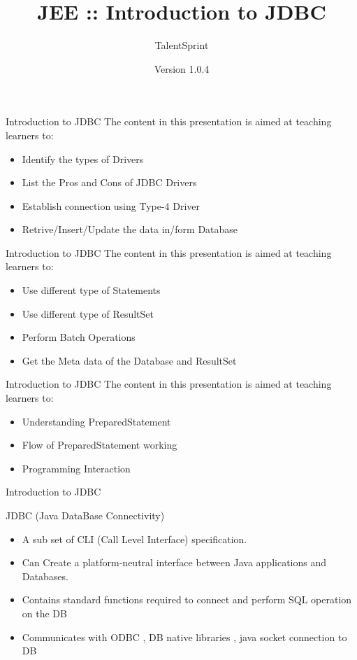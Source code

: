 \documentclass[14pt]{beamer}
\title[CP01.13 BC]{JEE :: Introduction to JDBC}
\author[TS]{TalentSprint}
\institute[L\&D]{Licensed To Skill}
\date{Version 1.0.4}
\begin{document}
\begin{frame}
  \titlepage
\end{frame}

\begin{frame}{Introduction to JDBC}
The content in this presentation is aimed at teaching  learners to:
\begin{itemize}
  \item Identify the types of Drivers
  \item List the Pros and Cons of JDBC Drivers
  \item Establish connection using Type-4 Driver
  \item Retrive/Insert/Update the data in/form Database
\end{itemize}
\end{frame}


\begin{frame}{Introduction to JDBC}
The content in this presentation is aimed at teaching  learners to:
\begin{itemize}
  \item Use different type of Statements
  \item Use different type of ResultSet
  \item Perform Batch Operations
  \item Get the Meta data of the Database and ResultSet
\end{itemize}
\end{frame}

\begin{frame}{Introduction to JDBC}
The content in this presentation is aimed at teaching  learners to:
\begin{itemize}
  \item Understanding PreparedStatement
  \item Flow of PreparedStatement working
  \item Programming Interaction
\end{itemize}
\end{frame}


\begin{frame}{Introduction to JDBC}
\begin{block}{}
JDBC (Java DataBase Connectivity)
\end{block}

\begin{itemize}
\item A sub set of CLI (Call Level Interface) specification.
\item Can Create a platform-neutral interface between Java applications and Databases.
\item Contains standard functions required to connect and perform SQL operation on the DB
\item Communicates with ODBC , DB native libraries , java socket connection to DB
\end{itemize}
\end{frame}
\end{document}
